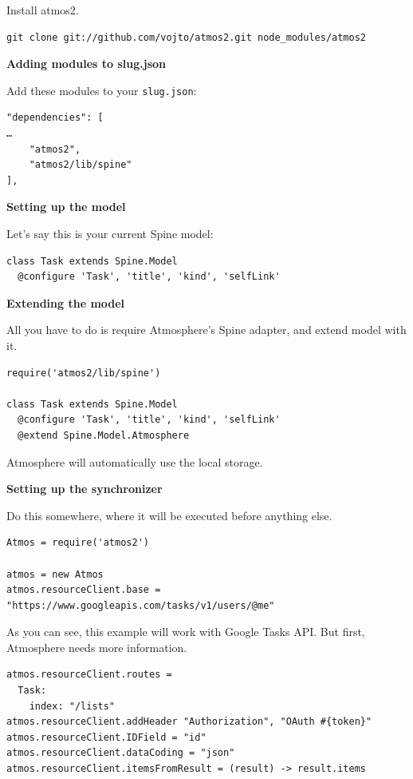 Install atmos2.

\begin{lstlisting}[caption=Installing atmos2 package]
git clone git://github.com/vojto/atmos2.git node_modules/atmos2
\end{lstlisting}

\textbf{Adding modules to slug.json}

Add these modules to your \texttt{slug.json}:

\begin{lstlisting}[caption=Updating slug.json with atmos2 package]
"dependencies": [
…
	"atmos2",
	"atmos2/lib/spine"
],
\end{lstlisting}

\textbf{Setting up the model}

Let's say this is your current Spine model:

\begin{lstlisting}[caption=Current Spine model]
class Task extends Spine.Model
  @configure 'Task', 'title', 'kind', 'selfLink'
\end{lstlisting}

\textbf{Extending the model}

All you have to do is require Atmosphere's Spine adapter, and extend model with it.

\begin{lstlisting}[caption=Requiring Atmosphere's Spine adpater]
require('atmos2/lib/spine')

class Task extends Spine.Model
  @configure 'Task', 'title', 'kind', 'selfLink'
  @extend Spine.Model.Atmosphere
\end{lstlisting}

Atmosphere will automatically use the local storage.

\textbf{Setting up the synchronizer}

Do this somewhere, where it will be executed before anything else.

\begin{lstlisting}[caption=Setting up the synchronizer]
Atmos = require('atmos2')

atmos = new Atmos
atmos.resourceClient.base = "https://www.googleapis.com/tasks/v1/users/@me"
\end{lstlisting}

As you can see, this example will work with Google Tasks API. But first, Atmosphere needs more information.

\begin{lstlisting}[caption=Setting up Synchronizer]
atmos.resourceClient.routes =
  Task:
    index: "/lists"
atmos.resourceClient.addHeader "Authorization", "OAuth #{token}"
atmos.resourceClient.IDField = "id"
atmos.resourceClient.dataCoding = "json"
atmos.resourceClient.itemsFromResult = (result) -> result.items
\end{lstlisting}
    
